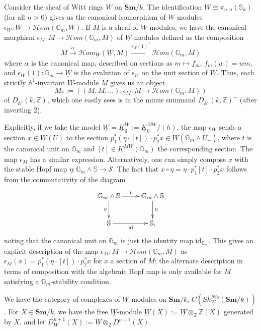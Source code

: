 \documentclass[a4paper,12pt,draft]{amsart}
\theoremstyle{definition}
\theoremstyle{remark}
\begin{document}
Consider the sheaf of  Witt rings $\underline{W}$ on ${{\mathbf{Sm}}}/k$. The identification $\underline{W}\cong \pi_{n,n}({{\mathbb S}}_k)$ (for all $n>0$) gives us the canonical isomorphism of $W$-modules $\epsilon_W:\underline{W}\to {{\mathcal{H}{om}}}({{\mathbb G}}_m, \underline{W})$. If $M$ is a sheaf of $\underline{W}$-modules, we have the canonical morphism
$\epsilon_M:M\to {{\mathcal{H}{om}}}({{\mathbb G}}_m, M)$ of $\underline{W}$-modules defined as the composition
\[
M\xrightarrow{\alpha} {{\mathcal{H}{om}}}_{\underline{W}}(\underline{W}, M)\xrightarrow{\epsilon_W(1)^*}{{\mathcal{H}{om}}}({{\mathbb G}}_m, M)
\]
where $\alpha$ is the canonical map, described on sections as $m\mapsto f_m$, $f_m(w)=wm$, and $\epsilon_W(1):{{\mathbb G}}_m\to \underline{W}$ is the evalution of $\epsilon_W$ on the unit section of $W$. Thus, each strictly ${{\mathbb A}}^1$-invariant $\underline{W}$-module $M$ gives us an object 
\[
M_*:=((M, M,\ldots), \epsilon_M:M\to {{\mathcal{H}{om}}}({{\mathbb G}}_m,M)) 
\]
of $D_{{{\mathbb A}}^1}(k,{{\mathbb Z}})$, which one easily sees is in the minus summand $D_{{{\mathbb A}}^1}(k,{{\mathbb Z}})^-$ (after inverting 2). 

Explicitly, if we take the model $\underline{W}=\underline{K}_0^{W}:=\underline{K}_0^{MW}/(h)$, the map $\epsilon_W$ sends a section $x\in \underline{W}(U)$ to the section $ p_1^*(\eta\cdot[t])\cdot p_2^*x\in \underline{W}({{\mathbb G}}_m\wedge U_+)$, where $t$ is the canonical unit on ${{\mathbb G}}_m$ and $[t]\in \underline{K}^{MW}_1({{\mathbb G}}_m)$ the corresponding section. The map $\epsilon_M$ has a similar expression. Alternatively, one can simply compose $x$ with the stable Hopf map $\eta:{{\mathbb G}}_m\wedge {{\mathbb S}}\to {{\mathcal S}}$. The fact that $x\circ\eta=\eta\cdot p_1^*[t]\cdot p_2^*x$ follows from the commutativity of the diagram
\[
\xymatrix{
{{\mathbb G}}_m\wedge{{\mathbb S}}\ar[r]^{t}\ar[d]_\eta&{{\mathbb G}}_m\wedge{{\mathbb S}}\ar[d]^\eta\\
{{\mathbb S}}\ar[r]_{\text{id}}&{{\mathbb S}},}
\]
noting that the canonical unit on ${{\mathbb G}}_m$ is just the identity map $\text{id}_{{{\mathbb G}}_m}$. This gives an explicit description of the map $\epsilon_M:M\to {{\mathcal{H}{om}}}({{\mathbb G}}_m, M)$ as $\epsilon_M(x)=p_1^*(\eta\cdot [t])\cdot p_2^*x$ for $x$ a section of $M$; the alternate description in terms of composition with the algebraic Hopf map is only available for $M$ satisfying a ${{\mathbb G}}_m$-stability condition.

We have the category of complexes of  $\underline{W}$-modules on ${{\mathbf{Sm}}}/k$, $C(Sh^{Nis}_{\underline{W}}({{\mathbf{Sm}}}/k))$. For $X\in {{\mathbf{Sm}}}/k$, we have the free $\underline{W}$-module $\underline{W}(X):=\underline{W}\otimes_{{\mathbb Z}}{{\mathbb Z}}(X)$ generated by $X$, 
and let $D^{n+1}_W(X):=\underline{W}\otimes_{{\mathbb Z}} D^{n+1}(X)$. 
\end{document}
